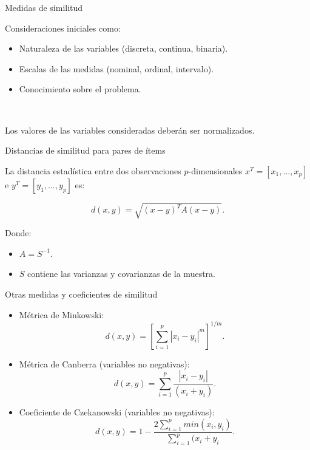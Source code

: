 \documentclass[spanish]{beamer}
\begin{document}
\begin{frame}{Medidas de similitud}

Consideraciones iniciales como:\break

\begin{itemize}
\item Naturaleza de las variables (discreta, continua, binaria).
\item Escalas de las medidas (nominal, ordinal, intervalo).
\item Conocimiento sobre el problema.
\end{itemize}\

Los valores de las variables consideradas deberán ser normalizados.
\end{frame}

\begin{frame}{Distancias de similitud para pares de ítems}

La distancia estadística entre dos observaciones $p$-dimensionales $x^T = [x_1,\dots,x_p]$ e $y^T=[y_1,\dots,y_p]$ es:

$$d(x,y)=\sqrt{(x-y)^TA(x-y)}. $$

Donde: \break
\begin{itemize}
\item $A=S^{-1}$. 
\item $S$ contiene las varianzas y covarianzas de la muestra.
\end{itemize}
\end{frame}

\begin{frame}{Otras medidas y coeficientes de similitud}

\begin{itemize}
\item Métrica de Minkowski:
$$ d(x,y)=\left  [\sum_{i=1}^{p}{|x_i-y_i|^m} \right ]^{1/m}.$$
\item Métrica de Canberra (variables no negativas):
$$d(x,y)=\sum_{i=1}^{p}{\frac{|x_i-y_i|}{(x_i+y_i)}}.$$
\item Coeficiente de Czekanowski (variables no negativas):
$$d(x,y)=1-\frac{2\sum_{i=1}^{p}{min(x_i,y_i)}}{\sum_{i=1}^{p}{(x_i+y_i}}.$$
\end{itemize}
\end{frame}

\end{document}
